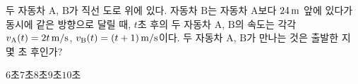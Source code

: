 두 자동차 $\mathrm{A}$, $\mathrm{B}$가 직선 도로 위에 있다. 자동차 $\mathrm{B}$는 자동차 $\mathrm{A}$보다 $24\mkern3mu \mathrm{m}$ 앞에 있다가 동시에 같은 방향으로 달릴 때, $t$초 후의 두 자동차 $\mathrm{A}$, $\mathrm{B}$의 속도는 각각 $v_{\mathrm{A}}(t)=2t\mkern3mu \mathrm{m/s}$, $v_{\mathrm{B}}(t)=(t+1)\mkern3mu \mathrm{m/s}$이다. 두 자동차 $\mathrm{A}$, $\mathrm{B}$가 만나는 것은 출발한 지 몇 초 후인가?
\begin{choices32}{$6$초}{$7$초}{$8$초}{$9$초}{$10$초}\end{choices32}
